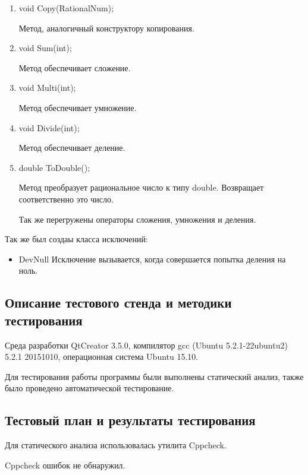 \documentclass[12pt,a4paper]{report}
\begin{document}
\begin{enumerate}	
	\item void Copy(RationalNum);
	
	Метод, аналогичный конструктору копирования.
	
	\item void Sum(int);
	
	Метод обеспечивает сложение. 
	
	\item void Multi(int);
	
	Метод обеспечивает умножение.
	
	\item void Divide(int);
	
	Метод обеспечивает деление.
	
	\item double ToDouble();
	
	Метод преобразует рациональное число к типу double. Возвращает соответственно это число.
	
	Так же перегружены операторы сложения, умножения и деления.

\end{enumerate}
	Так же был создаы класса исключений:
	
		\begin{itemize}
		\item DevNull
		Исключение вызывается, когда совершается попытка деления на ноль.
		\end{itemize}
		
		
\subsection{Описание тестового стенда и методики тестирования}
Среда разработки QtCreator 3.5.0, компилятор gcc (Ubuntu 5.2.1-22ubuntu2) 5.2.1 20151010, операционная система Ubuntu 15.10.

Для тестирования работы программы были выполнены статический анализ, также было проведено автоматической тестирование.

\subsection{Тестовый план и результаты тестирования}

Для статического анализа использовалась утилита Cppcheck.

\vspace{\baselineskip}
Cppcheck ошибок не обнаружил.
\vspace{\baselineskip}
\end{document}
